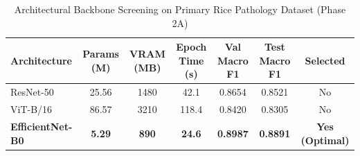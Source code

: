 \begin{table}[htbp]
\centering
\caption{Architectural Backbone Screening on Primary Rice Pathology Dataset (Phase 2A)}
\label{tab:backbone_screening}
\begin{tabular}{lcccccc}
\hline
\textbf{Architecture} & \textbf{Params (M)} & \textbf{VRAM (MB)} & \textbf{Epoch Time (s)} & \textbf{Val Macro F1} & \textbf{Test Macro F1} & \textbf{Selected} \\
\hline
ResNet-50 & 25.56 & 1480 & 42.1 & 0.8654 & 0.8521 & No \\
ViT-B/16 & 86.57 & 3210 & 118.4 & 0.8420 & 0.8305 & No \\
\textbf{EfficientNet-B0} & \textbf{5.29} & \textbf{890} & \textbf{24.6} & \textbf{0.8987} & \textbf{0.8891} & \textbf{Yes (Optimal)} \\
\hline
\end{tabular}
\end{table}
